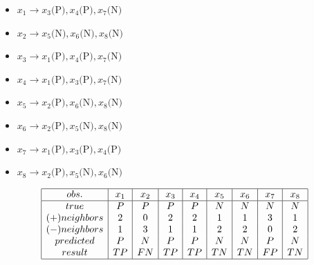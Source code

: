 \documentclass[12pt]{article}
\begin{document}
\begin{enumerate}[leftmargin=\labelsep, label=\textbf{\arabic*.)}]
\begin{itemize}
                    \begin{itemize}
                        \item \( x_1 \rightarrow x_3\text{(P)}, x_4\text{(P)}, x_7\text{(N)} \)
                        \item \( x_2 \rightarrow x_5\text{(N)}, x_6\text{(N)}, x_8\text{(N)} \)
                        \item \( x_3 \rightarrow x_1\text{(P)}, x_4\text{(P)}, x_7\text{(N)} \)
                        \item \( x_4 \rightarrow x_1\text{(P)}, x_3\text{(P)}, x_7\text{(N)} \)
                        \item \( x_5 \rightarrow x_2\text{(P)}, x_6\text{(N)}, x_8\text{(N)} \)
                        \item \( x_6 \rightarrow x_2\text{(P)}, x_5\text{(N)}, x_8\text{(N)} \)
                        \item \( x_7 \rightarrow x_1\text{(P)}, x_3\text{(P)}, x_4\text{(P)} \)
                        \item \( x_8 \rightarrow x_2\text{(P)}, x_5\text{(N)}, x_6\text{(N)} \)
                    \end{itemize}

                    \vspace{0.5em}

                    \begin{minipage}{1\textwidth}
                        \[
                            \begin{array}{|c|c|c|c|c|c|c|c|c|}
                                \hline
                                obs.          & x_1 & x_2 & x_3 & x_4 & x_5 & x_6 & x_7 & x_8 \\
                                \hline
                                true          & P   & P   & P   & P   & N   & N   & N   & N   \\
                                (+) neighbors & 2   & 0   & 2   & 2   & 1   & 1   & 3   & 1   \\
                                (-) neighbors & 1   & 3   & 1   & 1   & 2   & 2   & 0   & 2   \\
                                predicted     & P   & N   & P   & P   & N   & N   & P   & N   \\
                                result        & TP  & FN  & TP  & TP  & TN  & TN  & FP  & TN  \\
                                \hline
                            \end{array}
                        \]
                    \end{minipage}


\end{itemize}
\end{enumerate}
\end{document}
